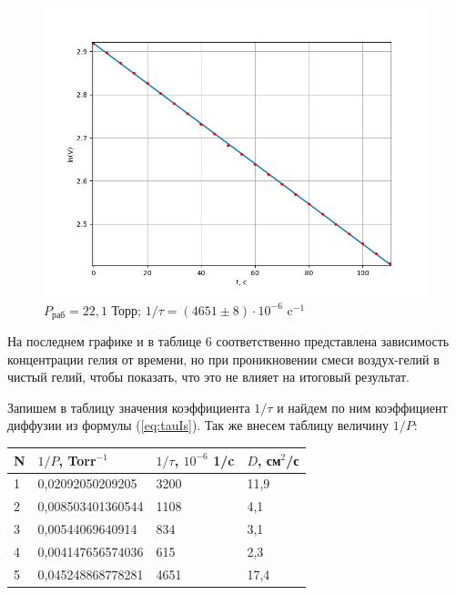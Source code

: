 \documentclass[12pt]{article}
\begin{document}
\begin{figure}[H]
	\centering
	\includegraphics[scale = 0.695]{./images/Gr5.png}
	\caption{$P_\text{раб} = 22,1$ Торр;  $1/\tau = (4651 \pm 8) \cdot 10^{-6}$ c$^{-1}$}
	\label{fig:Gr5}
\end{figure}

На последнем графике и в таблице 6 соответственно представлена зависимость концентрации гелия от времени, но при проникновении смеси воздух-гелий в чистый гелий, чтобы показать, что это не влияет на итоговый результат.

Запишем в таблицу значения коэффициента $1/\tau$ и найдем по ним коэффициент диффузии из формулы (\ref{eq:tauIs}). Так же внесем таблицу величину $1/P$:

\begin{table}[H]
	\centering
	\begin{tabular}{|l|l|l|l|}
		\hline
		N & $1/P$, Torr$^{-1}$ & $1/\tau$, $10^{-6}$ 1/c & $D$, см$^2$/с \\ \hline
		1 & 0,02092050209205   & 3200                    & 11,9         \\ \hline
		2 & 0,008503401360544  & 1108                    & 4,1         \\ \hline
		3 & 0,00544069640914   & 834                     & 3,1        \\ \hline
		4 & 0,004147656574036  & 615                     & 2,3        \\ \hline
		5 & 0,045248868778281  & 4651                    & 17,4       \\ \hline
	\end{tabular}
\end{table}
\end{document}
